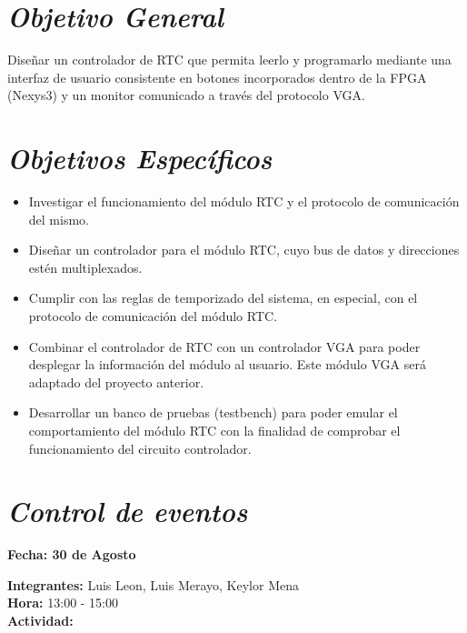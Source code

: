 \documentclass[12pt,a4paper]{report}
\begin{document}
\section*{\textit{Objetivo General}}
Diseñar un controlador de RTC que permita leerlo y programarlo mediante una interfaz de usuario consistente en botones incorporados dentro de la FPGA (Nexys3) y un monitor comunicado a través del protocolo VGA.

\section*{\textit{Objetivos Específicos}}
\begin{itemize}
	\item Investigar el funcionamiento del módulo RTC y el protocolo de comunicación del mismo.
	\item Diseñar un controlador para el módulo RTC, cuyo bus de datos y direcciones estén multiplexados.
	\item Cumplir con las reglas de temporizado del sistema, en especial, con el protocolo de comunicación del módulo RTC.
	\item Combinar el controlador de RTC con un controlador VGA para poder desplegar la información del módulo al usuario. Este módulo VGA será adaptado del proyecto anterior.
	\item Desarrollar un banco de pruebas (testbench) para poder emular el comportamiento del módulo RTC con la finalidad de comprobar el funcionamiento del circuito controlador.
\end{itemize}

\newpage

\section*{\textit{Control de eventos}}

\begin{flushright}
	\begin{large}
		\textbf{Fecha: 30 de Agosto}\\[5ex]
	\end{large}
\end{flushright}

\noindent \textbf{Integrantes:} Luis Leon, Luis Merayo, Keylor Mena \\[1ex]
\textbf{Hora:} 13:00 - 15:00 \\[1ex]
\textbf{Actividad:} \\[2ex]
\end{document}
